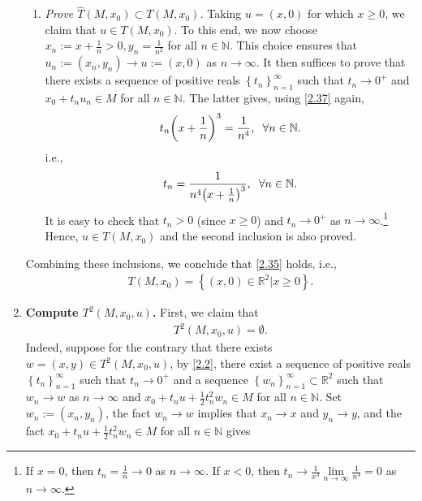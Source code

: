 \documentclass[a4paper]{article}
\numberwithin{equation}{section}
\begin{document}
\begin{enumerate}
\begin{enumerate}
\item \textit{Prove $\widehat T\left( {M,{x_0}} \right) \subset T\left( {M,{x_0}} \right)$.} Taking $u=\left(x,0\right)$ for which $x\ge 0$, we claim that $u\in T\left(M,x_0\right)$. To this end, we now choose $x_n:=x+\frac{1}{n}>0, y_n=\frac{1}{n^2}$ for all $n\in \mathbb{N}$. This choice ensures that $u_n:=\left(x_n,y_n\right) \to u:=\left(x,0\right)$ as $n\to \infty$. It then suffices to prove that there exists a sequence of positive reals $\left\{ {{t_n}} \right\}_{n = 1}^\infty $ such that $t_n\to 0^+$ and $x_0+t_nu_n\in M$ for all $n\in \mathbb{N}$. The latter gives, using \eqref{2.37} again,
\begin{align}
{t_n}{\left( {x + \frac{1}{n}} \right)^3} = \frac{1}{{{n^4}}},\hspace{0.2cm}\forall n \in \mathbb{N}.
\end{align}
i.e.,
\begin{align}
{t_n} = \frac{1}{{{n^4}{{\left( {x + \frac{1}{n}} \right)}^3}}},\hspace{0.2cm}\forall n \in \mathbb{N}.
\end{align}
It is easy to check that $t_n>0$ (since $x\ge 0$) and $t_n\to 0^+$ as $n\to \infty$.\footnote{If $x=0$, then $t_n =\frac{1}{n}\to 0$ as $n\to \infty$. If $x<0$, then ${t_n} \to \frac{1}{{{x^3}}}\mathop {\lim }\limits_{n \to \infty } \frac{1}{{{n^4}}} = 0$ as $n\to \infty$.} Hence, $u\in T\left(M,x_0\right)$ and the second inclusion is also proved.
\end{enumerate}
Combining these inclusions, we conclude that \eqref{2.35} holds, i.e.,
\begin{align}
T\left( {M,{x_0}} \right) = \left\{ {\left( {x,0} \right) \in {\mathbb{R}^2}|x \ge 0} \right\}.
\end{align}
\item \textbf{Compute ${T^2}\left( {M,{x_0},u} \right)$.} First, we claim that
\begin{align}
\label{2.41}
{T^2}\left( {M,{x_0},u} \right) = \emptyset . 
\end{align}
Indeed, suppose for the contrary that there exists $w=\left(x,y\right) \in T^2\left(M,x_0,u\right)$, by \eqref{2.2}, there exist a sequence of positive reals $\left\{ {{t_n}} \right\}_{n = 1}^\infty $ such that $t_n\to 0^+$ and a sequence $\left\{ {{w_n}} \right\}_{n = 1}^\infty  \subset {\mathbb{R}^2}$ such that $w_n\to w$ as $n\to \infty$ and ${x_0} + {t_n}u + \frac{1}{2}t_n^2{w_n} \in M$ for all $n\in \mathbb{N}$. Set $w_n:=\left(x_n,y_n\right)$, the fact $w_n\to w$ implies that $x_n\to x$ and $y_n\to y$, and the fact ${x_0} + {t_n}u + \frac{1}{2}t_n^2{w_n} \in M$ for all $n\in \mathbb{N}$ gives

\end{enumerate}
\end{document}
